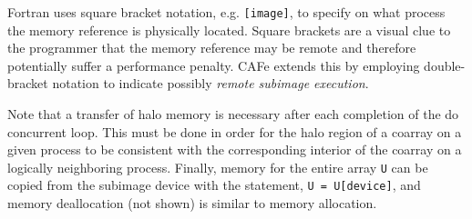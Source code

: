 Fortran uses square bracket notation, e.g. \texttt{[image]}, to specify on what process the
memory reference is physically located.  Square brackets are a visual clue to the
programmer that the memory reference may be remote and therefore potentially suffer a
performance penalty.  CAFe extends this by employing double-bracket notation to indicate
possibly \emph{remote subimage execution}.

Note that a transfer of halo memory is necessary after each completion of the do concurrent loop.
This must be done in order for the halo region of a coarray on a given process to be consistent
with the corresponding interior of the coarray on a logically neighboring process.
Finally, memory for the entire array \texttt{U} can be copied from the
subimage device with the statement,
\texttt{U = U[device]}, 
and memory deallocation (not shown) is similar to memory allocation.

